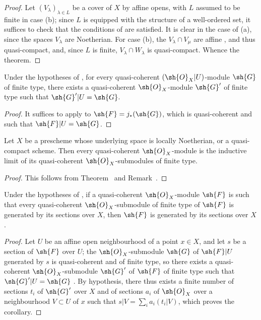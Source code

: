 \begin{proof}
Let $(V_\lambda)_{\lambda\in L}$ be a cover of $X$ by affine opens, with $L$ assumed to be finite
in case (b); since $L$ is equipped with the structure of a well-ordered set, it suffices to
check that the conditions of  are satisfied. It is clear in the case of (a),
    since the spaces $V_\lambda$ are Noetherian. For case (b), the $V_\lambda\cap V_\mu$ are
affine , and thus quasi-compact, and, since $L$ is finite,
$V_\lambda\cap W_\lambda$ is quasi-compact. Whence the theorem.
\end{proof}

\begin{corollary}[9.4.8]
\label{I.9.4.8}
Under the hypotheses of , for every quasi-coherent $(\sh{O}_X|U)$-module
$\sh{G}$ of finite type, there exists a quasi-coherent $\sh{O}_X$-module $\sh{G}'$ of finite
type such that $\sh{G}'|U=\sh{G}$.
\end{corollary}

\begin{proof}
It suffices to apply  to $\sh{F}=j_*(\sh{G})$, which is quasi-coherent
 and such that $\sh{F}|U=\sh{G}$.
\end{proof}

\begin{corollary}[9.4.9]
\label{I.9.4.9}
Let $X$ be a prescheme whose underlying space is locally Noetherian, or a quasi-compact
scheme. Then every quasi-coherent $\sh{O}_X$-module is the inductive limit of its quasi-coherent
$\sh{O}_X$-submodules of finite type.
\end{corollary}

\begin{proof}
This follows from Theorem~ and Remark~.
\end{proof}

\begin{corollary}[9.4.10]
\label{I.9.4.10}
Under the hypotheses of , if a quasi-coherent $\sh{O}_X$-module $\sh{F}$ is
such that every quasi-coherent $\sh{O}_X$-submodule of finite type of $\sh{F}$ is generated by
its sections over $X$, then $\sh{F}$ is generated by its sections over $X$.
\end{corollary}

\begin{proof}
Let $U$ be an affine open neighbourhood of a point $x\in X$, and let $s$ be a
section of $\sh{F}$ over $U$; the $\sh{O}_X$-submodule $\sh{G}$ of $\sh{F}|U$ generated by $s$
is quasi-coherent and of finite type, so there exists a quasi-coherent $\sh{O}_X$-submodule
$\sh{G}'$ of $\sh{F}$ of finite type such that $\sh{G}'|U=\sh{G}$ . By
hypothesis, there thus exists a finite number of sections $t_i$ of $\sh{G}'$ over $X$ and of
sections $a_i$ of $\sh{O}_X$ over a neighbourhood $V\subset U$ of $x$ such that
$s|V=\sum_i a_i(t_i|V)$, which proves the corollary.
\end{proof}

